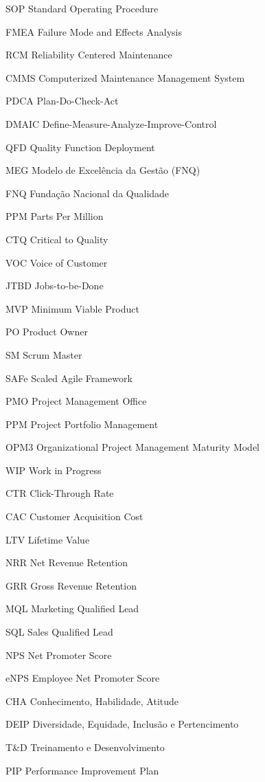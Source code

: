 \begin{siglas}
\item[SOP] Standard Operating Procedure
\item[FMEA] Failure Mode and Effects Analysis
\item[RCM] Reliability Centered Maintenance
\item[CMMS] Computerized Maintenance Management System
\item[PDCA] Plan-Do-Check-Act
\item[DMAIC] Define-Measure-Analyze-Improve-Control
\item[QFD] Quality Function Deployment
\item[MEG] Modelo de Excelência da Gestão (FNQ)
\item[FNQ] Fundação Nacional da Qualidade
\item[PPM] Parts Per Million
\item[CTQ] Critical to Quality
\item[VOC] Voice of Customer
\item[JTBD] Jobs-to-be-Done
\item[MVP] Minimum Viable Product
\item[PO] Product Owner
\item[SM] Scrum Master
\item[SAFe] Scaled Agile Framework
\item[PMO] Project Management Office
\item[PPM] Project Portfolio Management
\item[OPM3] Organizational Project Management Maturity Model
\item[WIP] Work in Progress
\item[CTR] Click-Through Rate
\item[CAC] Customer Acquisition Cost
\item[LTV] Lifetime Value
\item[NRR] Net Revenue Retention
\item[GRR] Gross Revenue Retention
\item[MQL] Marketing Qualified Lead
\item[SQL] Sales Qualified Lead
\item[NPS] Net Promoter Score
\item[eNPS] Employee Net Promoter Score
\item[CHA] Conhecimento, Habilidade, Atitude
\item[DEIP] Diversidade, Equidade, Inclusão e Pertencimento
\item[T\&D] Treinamento e Desenvolvimento
\item[PIP] Performance Improvement Plan

\end{siglas}
